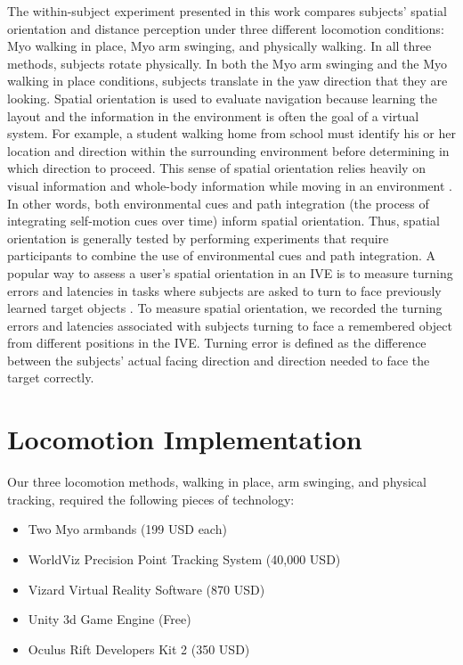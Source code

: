 \documentclass[titlepage]{article}
\theoremstyle{definition}
\theoremstyle{proof}
\begin{document}
The within-subject experiment presented in this work compares
subjects' spatial orientation and distance perception under three different locomotion conditions:
Myo walking in place, Myo arm swinging, and physically walking.
In all three methods, subjects rotate physically.
In both the Myo arm swinging and the Myo walking in place conditions, subjects translate in
the yaw direction that they are looking.
Spatial orientation is used
to evaluate navigation because learning the layout and the information in the environment is often the goal of a virtual system.
For example, a student walking home from school must identify his or
her location and direction within the surrounding environment before determining in which direction to proceed.
This sense of spatial orientation relies heavily on visual information and whole-body
information while moving in an environment \cite{wartenberg:book}.
In other words, both environmental cues and path integration (the process of integrating self-motion cues over time) inform
spatial orientation.
Thus, spatial orientation is generally tested by
performing experiments that require participants to combine the use
of environmental cues and path integration.
A popular way to assess a user's spatial orientation in an IVE
is to measure turning errors and latencies in tasks where subjects are asked to turn to face
previously learned target objects \cite{may} .
To measure spatial
orientation, we recorded the turning errors and latencies associated
with subjects turning to face a remembered object from different
positions in the IVE.
Turning error is defined as the difference between the subjects' actual facing direction and direction needed to
face the target correctly.

\newpage
\section{Locomotion Implementation}
Our three locomotion methods,
walking in place, arm swinging, and physical tracking,
required the following pieces of technology:
\begin{itemize}
\item Two Myo armbands (199 USD each)
\item WorldViz Precision Point Tracking System (40,000 USD)
\item Vizard Virtual Reality Software (870 USD)
\item Unity 3d Game Engine (Free)
\item Oculus Rift Developers Kit 2 (350 USD)
\end{itemize}
\end{document}
